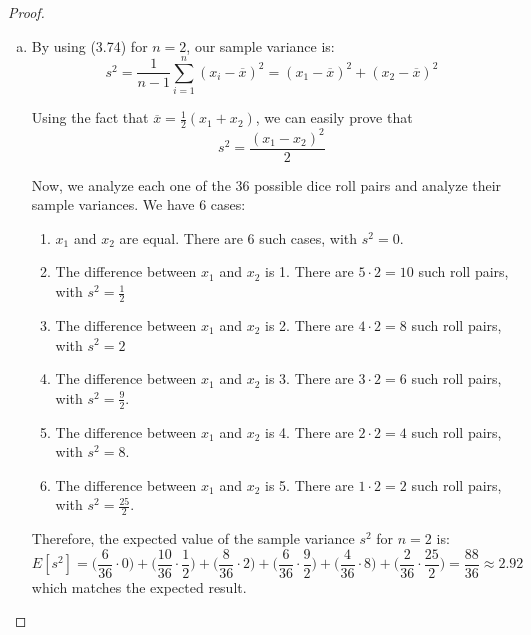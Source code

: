 \begin{proof}
    \hfill

    \begin{enumerate}[(a)]
        \item By using (3.74) for $n = 2$, our sample variance is:
             \[
                 s^2 = \frac{1}{n - 1}\sum_{i = 1}^n (x_i - \overline{x})^2
                 = (x_1 - \overline{x})^2 + (x_2 - \overline{x})^2
            \] 

        Using the fact that $\overline{x} = \frac{1}{2}(x_1 + x_2)$, we
        can easily prove that 
        \[
            s^2 = \frac{(x_1 - x_2)^2}{2}
        \] 

        Now, we analyze each one of the 36 possible dice roll pairs and analyze their sample variances.
        We have 6 cases: 
        \begin{enumerate}[(1)]
            \item $x_1$ and $x_2$ are equal. There are 6 such cases, with $s^2 = 0$.

            \item The difference between $x_1$ and $x_2$ is 1. There are $5 \cdot 2 = 10$ 
                such roll pairs, with $s^2 = \frac{1}{2}$

            \item The difference between $x_1$ and $x_2$ is 2. There are $4 \cdot 2 = 8$ 
                such roll pairs, with $s^2 = 2$

            \item The difference between $x_1$ and $x_2$ is 3. There are $3 \cdot 2 = 6$ 
                such roll pairs, with $s^2 = \frac{9}{2}$.

            \item The difference between $x_1$ and $x_2$ is 4. There are $2 \cdot 2 = 4$ 
                such roll pairs, with $s^2 = 8$.

            \item The difference between $x_1$ and $x_2$ is 5. There are $1 \cdot 2 = 2$ 
                such roll pairs, with $s^2 = \frac{25}{2}$.
        \end{enumerate}

        Therefore, the expected value of the sample variance $s^2$ for $n = 2$ is:
        \[
            E[s^2] = \bigg(\frac{6}{36} \cdot 0\bigg) + \bigg(\frac{10}{36} \cdot \frac{1}{2}\bigg)
                  + \bigg(\frac{8}{36} \cdot 2\bigg) + \bigg(\frac{6}{36} \cdot \frac{9}{2}\bigg) 
                  + \bigg(\frac{4}{36} \cdot 8\bigg) + \bigg(\frac{2}{36} \cdot \frac{25}{2}\bigg) 
                  = \frac{88}{36} \approx 2.92
        \]
        which matches the expected result.


\end{enumerate}
\end{proof}
